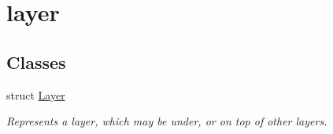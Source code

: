 \hypertarget{group__layer}{}\section{layer}
\label{group__layer}
\subsection*{Classes}
\begin{DoxyCompactItemize}
\item 
struct \mbox{\hyperlink{struct_layer}{Layer}}
\begin{DoxyCompactList}\small\item\em Represents a layer, which may be under, or on top of other layers. \end{DoxyCompactList}\end{DoxyCompactItemize}
